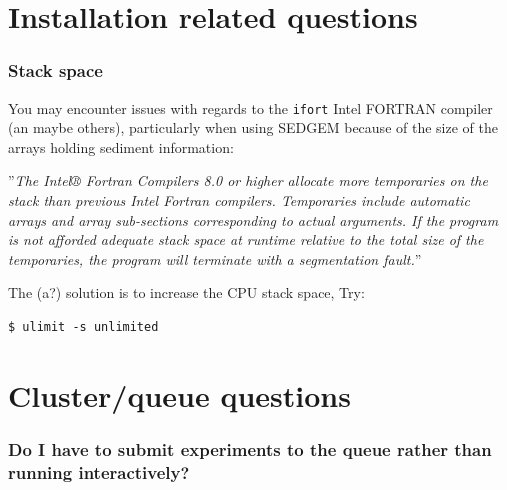 \documentclass[11pt,fleqn]{book} %
\begin{document}

\section{Installation related questions}

%

\subsubsection{Stack space}

You may encounter issues with regards to the \texttt{ifort} Intel FORTRAN compiler (an maybe others), particularly when using SEDGEM because of the size of the arrays holding sediment information:

\vspace{2mm}
\noindent ''\textit{The Intel® Fortran Compilers 8.0 or higher allocate more temporaries on the stack than previous Intel Fortran compilers.
Temporaries include automatic arrays and array sub-sections corresponding to actual arguments. If the program is not afforded adequate stack space at runtime relative to the total size of the temporaries,
the program will terminate with a segmentation fault.}''

\vspace{2mm}
\noindent The (a?) solution is to increase the CPU stack space, Try:
\vspace{-2pt}\begin{verbatim}$ ulimit -s unlimited\end{verbatim}\vspace{-2pt}


\newpage


\section{Cluster/queue questions}

%
\subsubsection{Do I have to submit experiments to the queue rather than running interactively?}
\end{document}
